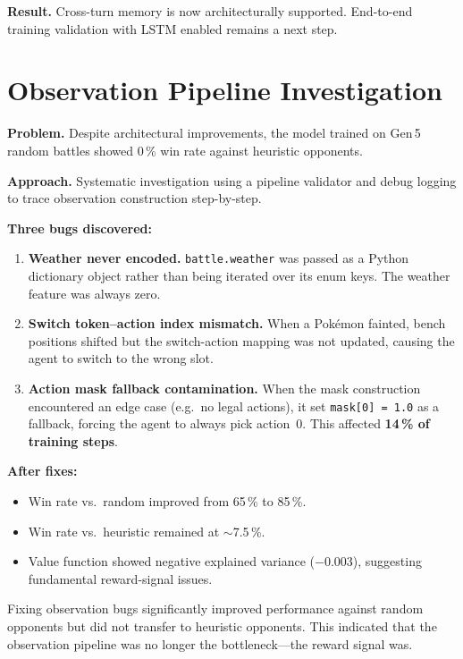 \textbf{Result.} Cross-turn memory is now architecturally supported.
End-to-end training validation with LSTM enabled remains a next step.

\section{Observation Pipeline Investigation}

\textbf{Problem.} Despite architectural improvements, the model trained on
Gen\,5 random battles showed 0\,\% win rate against heuristic opponents.

\textbf{Approach.} Systematic investigation using a pipeline validator and
debug logging to trace observation construction step-by-step.

\textbf{Three bugs discovered:}

\begin{enumerate}
  \item \textbf{Weather never encoded.} \texttt{battle.weather} was passed as
        a Python dictionary object rather than being iterated over its enum
        keys.  The weather feature was always zero.
  \item \textbf{Switch token--action index mismatch.} When a Pok\'{e}mon
        fainted, bench positions shifted but the switch-action mapping was not
        updated, causing the agent to switch to the wrong slot.
  \item \textbf{Action mask fallback contamination.} When the mask construction
        encountered an edge case (e.g.\ no legal actions), it set
        \texttt{mask[0] = 1.0} as a fallback, forcing the agent to always
        pick action~0.  This affected \textbf{14\,\% of training steps}.
\end{enumerate}

\textbf{After fixes:}
\begin{itemize}
  \item Win rate vs.\ random improved from 65\,\% to 85\,\%.
  \item Win rate vs.\ heuristic remained at $\sim$7.5\,\%.
  \item Value function showed negative explained variance ($-0.003$), suggesting
        fundamental reward-signal issues.
\end{itemize}

\begin{keyinsight}
Fixing observation bugs significantly improved performance against random
opponents but did not transfer to heuristic opponents.  This indicated that the
observation pipeline was no longer the bottleneck---the reward signal was.
\end{keyinsight}

